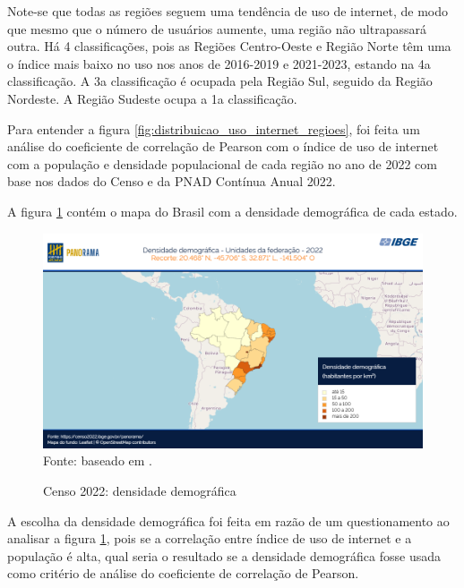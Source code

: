 Note-se que todas as regiões seguem uma tendência de uso de internet, de modo que mesmo que o número de usuários aumente, uma região não ultrapassará outra. Há 4 classificações, pois as Regiões Centro-Oeste e Região Norte têm uma o índice mais baixo no uso nos anos de 2016-2019 e 2021-2023, estando na 4a classificação. A 3a classificação é ocupada pela Região Sul, seguido da Região Nordeste. A Região Sudeste ocupa a 1a classificação.

Para entender a figura \ref{fig:distribuicao_uso_internet_regioes}, foi feita um análise do coeficiente de correlação de Pearson com o índice de uso de internet com a população e densidade populacional de cada região no ano de 2022 com base nos dados do Censo e da PNAD Contínua Anual 2022.

A figura \ref{fig:densidade_demografica} contém o mapa do Brasil com a densidade demográfica de cada estado.

\begin{figure}[H]
    \centering
    \caption{Censo 2022: densidade demográfica}
    \includegraphics[width=1\linewidth]{figuras/populacao/censo_2022_densidade_demografica.png}
    \label{fig:densidade_demografica}
    \footnotesize{Fonte: baseado em \cite{IBGE_censo_2022}.}
\end{figure}

A escolha da densidade demográfica foi feita em razão de um questionamento ao analisar a figura \ref{fig:densidade_demografica}, pois se a correlação entre índice de uso de internet e a população é alta, qual seria o resultado se a densidade demográfica fosse usada como critério de análise do coeficiente de correlação de Pearson.


